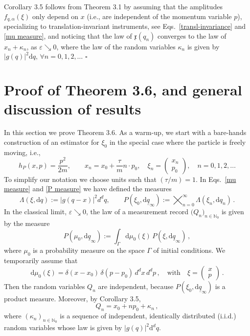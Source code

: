 \documentclass[11pt]{article}
\begin{document}
\medskip
Corollary 3.5 follows from Theorem 3.1 by assuming that the amplitudes $f_{q, \alpha}(\xi)$ only depend on $x$ 
(i.e., are independent of the momentum variable $p$), specializing to translation-invariant instruments, see 
Eqs.~\eqref{transl-invariance} and \eqref{mu measure}, and noticing that the law of $\mathfrak{x}(q_n)$ converges to the law of $x_n + \kappa_n$, 
as $\varepsilon \searrow 0$, where the law of the random variables $\kappa_n$ is given by 
$\vert g(q)\vert^{2} \text{d}q, \,\forall n=0,1,2, \dots$ \hfill$\square$



\section{Proof of Theorem 3.6, and general discussion of results}\label{sec:estim}
In this section we prove Theorem 3.6. As a warm-up, we start with a bare-hands construction of an estimator for $\xi_0$ in the special case
where the particle is freely moving, i.e.,
\begin{equation}\label{free particle}
h_P(x,p)= \frac{p^2}{2m}, \qquad x_n= x_0 + \frac{\tau}{m} n\cdot p_0, \quad \xi_{n} = 
\begin{pmatrix} x_n\\p_0 \end{pmatrix}, \quad n=0,1,2,\dots
\end{equation}
To simplify our notation we choose units such that $(\tau/m)=1$. In Eqs.~\eqref{mu measure} and \eqref{P measure} we have defined the measures 
$$\Lambda(\xi, \text{d}q):= \big| g(q-x) \big|^{2} d^{d}q, 
\qquad P(\xi_0, \text{d}\underline{q}_{\infty}):= \bigtimes_{n=0}^{\infty} \Lambda(\xi_n, \text{d}q_n)\,.$$
In the classical limit, $\varepsilon \searrow 0$, the law of a measurement record 
$\big(Q_n\big)_{n\in \mathbb{N}_0}$ is given by the measure 
\begin{equation}\label{Gibbs measure}
P(\mu_0, \text{d}\underline{q}_{\infty}):= \int_{\Gamma} \text{d}\mu_{0}(\xi)\, P(\xi, \text{d}\underline{q}_{\infty})\,,
\end{equation}
where $\mu_0$ is a probability measure on the space $\Gamma$ of initial conditions.
We temporarily assume that 
$$\text{d}\mu_{0}(\xi)= \delta(x- x_0) \, \delta(p - p_0)\,d^{d}x \, d^{d}p\,, \quad \text{with} \quad \xi=
\begin{pmatrix} x\\p \end{pmatrix}\,.$$
Then the random variables $Q_n$ are independent, because $P(\xi_0, \text{d}\underline{q}_{\infty})$ is a product measure. Moreover, by Corollary 3.5,
$$Q_n=x_0+np_0+\kappa_n\,,$$
where $(\kappa_n)_{n\in \mathbb N_0}$ is a sequence of independent, identically distributed (i.i.d.) random variables 
whose law is given by $|g(q)|^2\text{d}^dq$.
 
\end{document}
